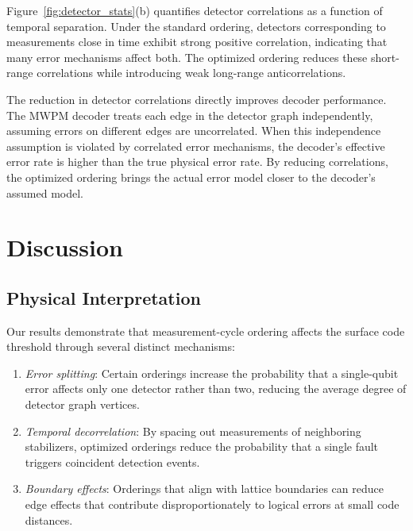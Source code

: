 \documentclass[
    reprint,
    aps,
    prx,
    superscriptaddress,
    longbibliography
]{revtex4-2}
\begin{document}
Figure~\ref{fig:detector_stats}(b) quantifies detector correlations as a function of temporal separation. Under the standard ordering, detectors corresponding to measurements close in time exhibit strong positive correlation, indicating that many error mechanisms affect both. The optimized ordering reduces these short-range correlations while introducing weak long-range anticorrelations.

The reduction in detector correlations directly improves decoder performance. The MWPM decoder treats each edge in the detector graph independently, assuming errors on different edges are uncorrelated. When this independence assumption is violated by correlated error mechanisms, the decoder's effective error rate is higher than the true physical error rate. By reducing correlations, the optimized ordering brings the actual error model closer to the decoder's assumed model.

\section{Discussion}
\label{sec:discussion}

\subsection{Physical Interpretation}
\label{subsec:physical_interpretation}

Our results demonstrate that measurement-cycle ordering affects the surface code threshold through several distinct mechanisms:

\begin{enumerate}[label=(\roman*)]
    \item \emph{Error splitting}: Certain orderings increase the probability that a single-qubit error affects only one detector rather than two, reducing the average degree of detector graph vertices.
    \item \emph{Temporal decorrelation}: By spacing out measurements of neighboring stabilizers, optimized orderings reduce the probability that a single fault triggers coincident detection events.
    \item \emph{Boundary effects}: Orderings that align with lattice boundaries can reduce edge effects that contribute disproportionately to logical errors at small code distances.
\end{enumerate}
\end{document}

